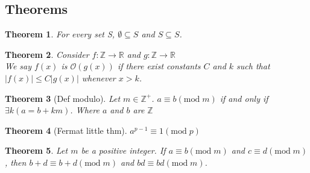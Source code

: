 \documentclass[5pt]{article}
\newtheorem{theorem}{Theorem}
\begin{document}
\begin{multicols}{2}
\subsection{Theorems}
\begin{theorem}
For every set S, $\emptyset\subseteq S$ and $S\subseteq S$.
\end{theorem}

\begin{theorem}
Consider $f:\mathbb{Z}\rightarrow\mathbb{R}$ and $g:\mathbb{Z}\rightarrow\mathbb{R}$\\
We say $f(x)$ is $\mathcal{O}(g(x))$ if there exist constants $C$ and $k$ such that\\
$|f(x)|\le C|g(x)|$ whenever $x>k$.
\end{theorem}

\begin{theorem}[Def modulo]
    Let $m\in\mathbb{Z}^+$. $a\equiv b(\text{mod}\; m)$ if and only if $\exists k  (a=b+km)$. Where $a$ and $b$ are $\mathbb{Z}$
\end{theorem}

\begin{theorem}[Fermat little thm]
    $a^{p-1}\equiv1(\text{mod}\;p)$
\end{theorem}

\begin{theorem}
    Let $m$ be a positive integer. If $a\equiv b(\text{mod}\; m)$ and $c\equiv d(\text{mod}\;m)$, then $b+d\equiv b+d(\text{mod}\; m)$ and $bd\equiv bd(\text{mod}\; m)$.
\end{theorem}


\end{multicols}
\end{document}
